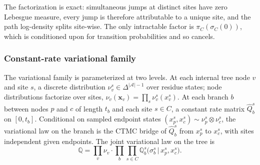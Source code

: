 \noindent The factorization is exact: simultaneous jumps at distinct
sites have zero Lebesgue measure, every jump is therefore
attributable to a unique site, and the path log-density splits
site-wise. The only intractable factor is $\pi_C(\sigma_C(0))$, which
is conditioned upon for transition probabilities and so cancels.

\subsubsection*{Constant-rate variational family}

\begin{remark}
The variational family is parameterized at two levels. At each
internal tree node $v$ and site $s$, a discrete distribution
$\nu_v^s \in \Delta^{|\mathcal{A}|-1}$ over residue states; node
distributions factorize over sites,
$\nu_v(\mathbf{x}_v) = \prod_s \nu_v^s(x_v^s)$. At each branch $b$
between nodes $p$ and $c$ of length $t_b$ and each site $s \in C$,
a constant rate matrix $\hat Q^s_b$ on $[0, t_b]$. Conditional on
sampled endpoint states $(x_p^s, x_c^s) \sim \nu_p^s \otimes \nu_c^s$,
the variational law on the branch is the CTMC bridge of
$\hat Q^s_b$ from $x_p^s$ to $x_c^s$, with sites independent given
endpoints. The joint variational law on the tree is
\[
    \mathbb{Q} = \prod_v \nu_v \cdot \prod_b \prod_{s \in C}
    \mathbb{Q}^s_b\bigl(\sigma^s_b \,\big|\, x_p^s, x_c^s\bigr).
\]
\end{remark}

